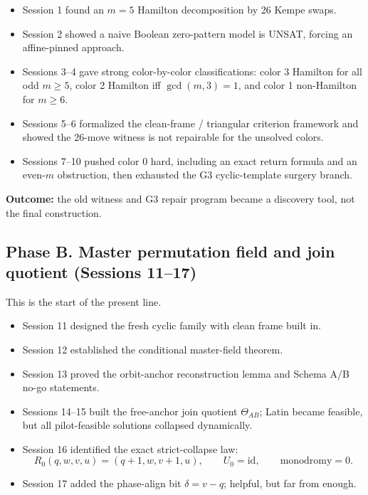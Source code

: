 \documentclass[11pt]{article}
\begin{document}
\begin{itemize}
    \item Session 1 found an $m=5$ Hamilton decomposition by 26 Kempe swaps.
    \item Session 2 showed a naive Boolean zero-pattern model is UNSAT, forcing an affine-pinned approach.
    \item Sessions 3--4 gave strong color-by-color classifications: color 3 Hamilton for all odd $m\ge 5$, color 2 Hamilton iff $\gcd(m,3)=1$, and color 1 non-Hamilton for $m\ge 6$.
    \item Sessions 5--6 formalized the clean-frame / triangular criterion framework and showed the 26-move witness is not repairable for the unsolved colors.
    \item Sessions 7--10 pushed color 0 hard, including an exact return formula and an even-$m$ obstruction, then exhausted the G3 cyclic-template surgery branch.
\end{itemize}

\textbf{Outcome:} the old witness and G3 repair program became a discovery tool, not the final construction.

\subsection*{Phase B. Master permutation field and join quotient (Sessions 11--17)}

This is the start of the present line.

\begin{itemize}
    \item Session 11 designed the fresh cyclic family with clean frame built in.
    \item Session 12 established the conditional master-field theorem.
    \item Session 13 proved the orbit-anchor reconstruction lemma and Schema A/B no-go statements.
    \item Sessions 14--15 built the free-anchor join quotient $\Theta_{AB}$; Latin became feasible, but all pilot-feasible solutions collapsed dynamically.
    \item Session 16 identified the exact strict-collapse law:
    \[
    R_0(q,w,v,u)=(q+1,w,v+1,u),
    \qquad U_0=\mathrm{id},
    \qquad \text{monodromy}=0.
    \]
    \item Session 17 added the phase-align bit $\delta=v-q$; helpful, but far from enough.
\end{itemize}
\end{document}
